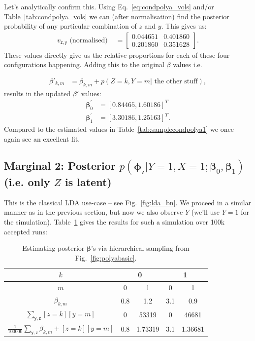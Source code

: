 \documentclass[oneside,english]{scrbook}
\begin{document}
Let's analytically confirm this. Using Eq.~\ref{eq:condpolya_vols}
and/or Table~\ref{tab:condpolya_vols} we can (after normalisation)
find the posterior probability of any particular combination of $z$
and $y$. This gives us:
\begin{align*}
  v_{\mathsf{z,y}} \text{ (normalised) }
  &= \left[
    \begin{array}{cc}
      0.044651 & 0.401860\\
      0.201860 & 0.351628
    \end{array}
    \right].
\end{align*}
These values directly give us the relative proportions for each of
these four configurations happening. Adding this to the original
$\beta$ values i.e.

\begin{align*}
  \beta'_{k,m} &= \beta_{k,m}+p(Z=k,Y=m|\text{ the other stuff}),
\end{align*}
results in the updated $\beta'$ values:
\begin{align*}
  \bm{\beta}^{'}_0 &= [0.84465,1.60186]^T\\
  \bm{\beta}^{'}_1 &= [3.30186, 1.25163]^T.
\end{align*}
Compared to the estimated values in Table~\ref{tab:samplecondpolya1} we
once again see an excellent fit.

\subsection{Marginal 2: Posterior $p(\bm{\phi}_{\mathsf{z}}|Y=1,X=1;\bm{\beta}_0,\bm{\beta}_1)$ (i.e. only $Z$ is latent)}
This is the classical LDA use-case -- see Fig.~\ref{fig:lda_bn}. We
proceed in a similar manner as in the previous section, but now we
also observe $Y$ (we'll use $Y=1$ for the simulation). Table~\ref{tab:samplecondpolya2} gives the results for such
a simulation over 100k accepted runs:
\begin{table}[!h]
\begin{center}
  \begin{tabular}{c | cc|cc}
    $k$ & \multicolumn{2}{c|}{0} & \multicolumn{2}{c}{1} \\ \hline
    $m$ & 0 & 1 & 0 & 1\\ \hline
    $\beta_{k,m}$ & 0.8 & 1.2 & 3.1 & 0.9\\
    $\sum_{\mathsf{y,z}}[z=k][y=m]$ & 0 & 53319 & 0 & 46681 \\
    $\frac{1}{100000}\sum_{\mathsf{y,z}} \beta_{k,m} + [z=k][y=m]$ & 0.8 & 1.73319 & 3.1 & 1.36681\\
  \end{tabular}
\end{center}
\caption{Estimating posterior $\bm{\beta}$'s via hierarchical sampling from Fig.~\ref{fig:polyabasic}.  \label{tab:samplecondpolya2} }
\end{table}
\end{document}
